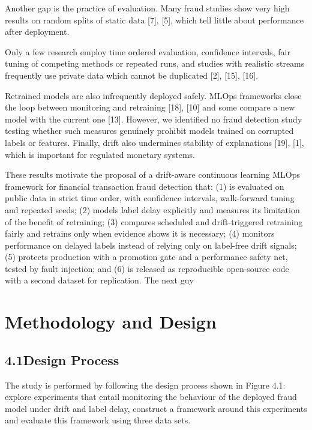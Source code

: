 \documentclass[11pt,letterpaper]{report}
\begin{document}
Another gap is the practice of evaluation. Many fraud studies show very high results on random splits of static data [7], [5], which tell little about performance after deployment.

Only a few research employ time ordered evaluation, confidence intervals, fair tuning of competing methods or repeated runs, and studies with realistic streams frequently use private data which cannot be duplicated [2], [15], [16].

Retrained models are also infrequently deployed safely. MLOps frameworks close the loop between monitoring and retraining [18], [10] and some compare a new model with the current one [13]. However, we identified no fraud detection study testing whether such measures genuinely prohibit models trained on corrupted labels or features. Finally, drift also undermines stability of explanations [19], [1], which is important for regulated monetary systems.

These results motivate the proposal of a drift-aware continuous learning MLOps framework for financial transaction fraud detection that: (1) is evaluated on public data in strict time order, with confidence intervals, walk-forward tuning and repeated seeds; (2) models label delay explicitly and measures its limitation of the benefit of retraining; (3) compares scheduled and drift-triggered retraining fairly and retrains only when evidence shows it is necessary; (4) monitors performance on delayed labels instead of relying only on label-free drift signals; (5) protects production with a promotion gate and a performance safety net, tested by fault injection; and (6) is released as reproducible open-source code with a second dataset for replication. The next guy

\setcounter{chapter}{3}
\chapter{Methodology and Design}

\section*{4.1\quad Design Process}

The study is performed by following the design process shown in Figure 4.1: explore experiments that entail monitoring the behaviour of the deployed fraud model under drift and label delay, construct a framework around this experiments and evaluate this framework using three data sets.
\end{document}
